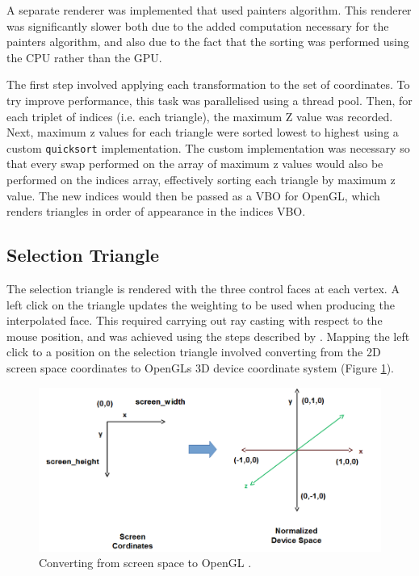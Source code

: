 \documentclass[12pt]{article}
\begin{document}
A separate renderer was implemented that used painters algorithm.
This renderer was significantly slower both due to the added computation necessary for the painters algorithm, and also due to the fact that the sorting was performed using the CPU rather than the GPU.

The first step involved applying each transformation to the set of coordinates. 
To try improve performance, this task was parallelised using a thread pool.
Then, for each triplet of indices (i.e. each triangle), the maximum Z value was recorded.
Next, maximum z values for each triangle were sorted lowest to highest using a custom \texttt{quicksort} implementation.
The custom implementation was necessary so that every swap performed on the array of maximum z values would also be performed on the indices array, effectively sorting each triangle by maximum z value.
The new indices would then be passed as a VBO for OpenGL, which renders triangles in order of appearance in the indices VBO.


\subsection{Selection Triangle}

The selection triangle is rendered with the three control faces at each vertex.
A left click on the triangle updates the weighting to be used when producing the interpolated face.
This required carrying out ray casting with respect to the mouse position, and was achieved using the steps described by \cite{screenspace}.
Mapping the left click to a position on the selection triangle involved converting from the 2D screen space coordinates to OpenGLs 3D device coordinate system (Figure \ref{fig:screen_coordinates}).

\begin{figure}[!ht]
	\centering
	\includegraphics[width=\linewidth]{images/screen_coordinates.png}
    \caption{Converting from screen space to OpenGL \cite{lwjglgamedev}.}
	\label{fig:screen_coordinates}
\end{figure}
\end{document}
